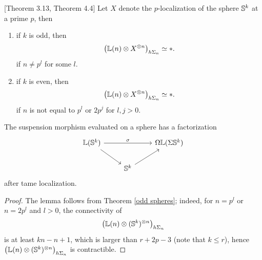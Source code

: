  
 \begin{theorem}
 	\cite{Arone-Mahowald}[Theorem 3.13, Theorem 4.4]
 	\label{odd spheres}
 	Let $X$ denote the $p$-localization of the sphere ${\mathbb{S}}^k$ at a prime $p$, then
 	\begin{enumerate}
 		\item if $k$ is odd, then 
 			$$
 			\big({\mathbb{L}}(n)\otimes X^{\otimes n}
 			\big)_{h\Sigma_n}
 			\simeq *.
 			$$
 			if $n\neq p^l$ for some $l$.
 		\item if $k$ is even, then 
 			$$
 			\big({\mathbb{L}}(n)\otimes X^{\otimes n}
 			\big)_{h\Sigma_n}
 			\simeq *.
 			$$
 			if $n$ is not equal to $p^l$ or $2p^j$ for $l, j>0$.
 	\end{enumerate} 	
 \end{theorem}
 \begin{lemma}
 
 	The suspension morphism evaluated on a sphere has a factorization
\[
\begin{tikzcd}
	 \BL(\BS^{k}) &   &  \Omega \BL (\Sigma \BS^{k})\\
	& \BS^{k}  &
	\arrow[from=1-1, to = 1-3, "\sigma"]
	\arrow[from=1-1 , to =2-2]
	\arrow[from=2-2, to=1-3]
\end{tikzcd}
\]
after tame localization.
\end{lemma}
\begin{proof}
	The lemma follows from Theorem \ref{odd spheres}; indeed, for $n=p^l$ or $n=2p^l$ and $l>0$, the connectivity of
	\[
	\big(
	{\mathbb{L}}(n)\otimes ({\mathbb{S}}^{k})^{\otimes n}
	\big)_{h\Sigma_n}
	\]
	is at least $kn-n+1$, which is larger than $r+2p-3$ (note that $k\leq r$), hence 
	$\big(
	{\mathbb{L}}(n)\otimes ({\mathbb{S}}^{k})^{\otimes n}
	\big)_{h\Sigma_n}$ is contractible.
	
	\end{proof}

